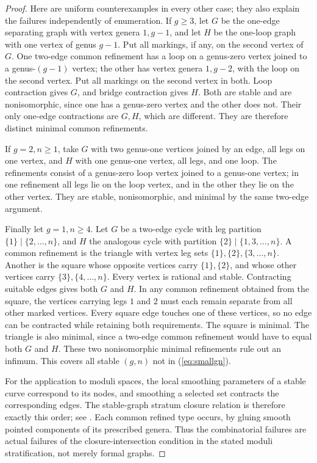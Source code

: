 \begin{proof}
Here are uniform counterexamples in every other case; they also explain
the failures independently of enumeration. If $g\geq3$, let $G$ be the
one-edge separating graph with vertex genera $1,g-1$, and let $H$ be
the one-loop graph with one vertex of genus $g-1$. Put all markings,
if any, on the second vertex of $G$. One two-edge common refinement
has a loop on a genus-zero vertex joined to a genus-$(g-1)$ vertex;
the other has vertex genera $1,g-2$, with the loop on the second
vertex. Put all markings on the second vertex in both. Loop
contraction gives $G$, and bridge contraction gives $H$. Both are
stable and are nonisomorphic, since one has a genus-zero vertex and
the other does not. Their only one-edge contractions are $G,H$, which
are different. They are therefore distinct minimal common refinements.

If $g=2,n\geq1$, take $G$ with two genus-one vertices joined by an
edge, all legs on one vertex, and $H$ with one genus-one vertex,
all legs, and one loop. The refinements consist of a genus-zero loop
vertex joined to a genus-one vertex; in one refinement all legs lie
on the loop vertex, and in the other they lie on the other vertex.
They are stable, nonisomorphic, and minimal by the same two-edge
argument.

Finally let $g=1,n\geq4$. Let $G$ be a two-edge cycle with leg
partition $\{1\}\mid\{2,\ldots,n\}$, and $H$ the analogous cycle
with partition $\{2\}\mid\{1,3,\ldots,n\}$. A common refinement is
the triangle with vertex leg sets $\{1\},\{2\},\{3,\ldots,n\}$.
Another is the square whose opposite vertices carry $\{1\},\{2\}$,
and whose other vertices carry $\{3\},\{4,\ldots,n\}$. Every
vertex is rational and stable. Contracting suitable edges gives both
$G$ and $H$. In any common refinement obtained from the square,
the vertices carrying legs $1$ and $2$ must each remain separate
from all other marked vertices. Every square edge touches one of
these vertices, so no edge can be contracted while retaining both
requirements. The square is minimal. The triangle is also minimal,
since a two-edge common refinement would have to equal both $G$ and
$H$. These two nonisomorphic minimal refinements rule out an infimum.
This covers all stable $(g,n)$ not in (\ref{eq:smallgn}).

For the application to moduli spaces, the local smoothing parameters
of a stable curve correspond to its nodes, and smoothing a selected
set contracts the corresponding edges. The stable-graph stratum
closure relation is therefore exactly this order; see
\cite[Proposition 4.14, Section 6.1, and Section 7.3]{Schmitt}.
Each common refined type occurs, by gluing smooth pointed components
of its prescribed genera. Thus the combinatorial failures are actual
failures of the closure-intersection condition in the stated moduli
stratification, not merely formal graphs.
\end{proof}
